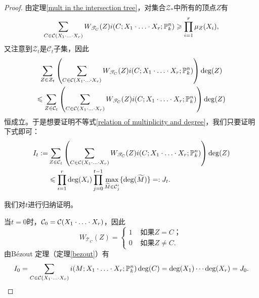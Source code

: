 \begin{proof}
由定理\ref{mult in the intersection tree}，对集合$\mathcal{Z}_*$中所有的顶点$Z$有
\begin{equation}
\sum_{C\in\mathcal C(X_1\cdot\ldots\cdot X_r)} W_{\mathscr T_C}(Z)i(C;X_1\cdot\ldots\cdot X_r;\mathbb P^n_k) \geqslant \prod_{i=1}^r\mu_Z(X_i),
\end{equation}
又注意到$\mathcal{Z}_t$是$\mathcal{C}_t$子集，因此
\begin{multline}
\sum\limits_{Z\in \mathcal{Z}_t} \left( \sum_{C\in\mathcal C(X_1\cdot\ldots\cdot X_r)} W_{\mathscr T_C}(Z)i(C;X_1\cdot\ldots\cdot X_r;\mathbb P^n_k) \right)\deg(Z) \\
\leqslant \sum\limits_{Z\in \mathcal{C}_t} \left( \sum_{C\in\mathcal C(X_1\cdot\ldots\cdot X_r)} W_{\mathscr T_C}(Z)i(C;X_1\cdot\ldots\cdot X_r;\mathbb P^n_k) \right)\deg(Z)
\end{multline}
恒成立。于是想要证明不等式\eqref{relation of multiplicity and degree}，我们只要证明下式即可：
\begin{align}
I_t := & \sum\limits_{Z\in \mathcal{C}_t} \left( \sum_{C\in\mathcal C(X_1\cdot\ldots\cdot X_r)} W_{\mathscr T_C}(Z)i(C;X_1\cdot\ldots\cdot X_r;\mathbb P^n_k) \right)\deg(Z) \\
& \leqslant \prod_{i=1}^r\deg(X_i)\prod_{j=0}^{t-1} \max_{\widetilde{M}\in \mathcal C'_j} \{\deg(\widetilde{M})\} =: J_t.
\end{align}

我们对$t$进行归纳证明。

当$t=0$时，$\mathcal{C}_0 = \mathcal C(X_1\cdot\ldots\cdot X_r)$，因此
\begin{equation}
W_{\mathscr T_C}(Z) = \begin{cases}
1 & \text{ 如果$Z = C$；} \\
0 & \text{ 如果$Z \neq C$.}
\end{cases}
\end{equation}
由B\'ezout 定理（定理\ref{bezout}）有
\begin{equation}
I_0 = \sum_{C\in \mathcal C(X_1\cdot\ldots\cdot X_r)} i(M;X_1\cdot\ldots\cdot X_r;\mathbb P^n_k) \deg(C) = \deg(X_1)\cdots\deg(X_r) = J_0.
\end{equation}


\end{proof}

